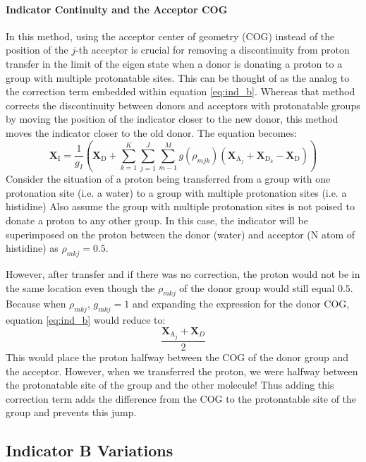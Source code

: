 \documentclass{article}
\newcommand{\mb}[1]{\mathbf{#1}}
\newcommand{\mr}[1]{\mathrm{#1}}
\begin{document}
\paragraph{Indicator Continuity and the Acceptor COG}
In this method, using the acceptor center of geometry (COG) instead of the position of the $j$-th acceptor is crucial for removing a discontinuity from proton transfer in the limit of the eigen state when a donor is donating a proton to a group with multiple protonatable sites.
This can be thought of as the analog to the correction term embedded within equation \ref{eq:ind_b}.
Whereas that method corrects the discontinuity between donors and acceptors with protonatable groups by moving the position of the indicator closer to the new donor, this method moves the indicator closer to the old donor.
The equation becomes:
\begin{equation}\label{eq:ind_b_with_correction}
\mathbf{X}_\mr{I} = \frac{1}{g_I} \left( \mathbf{X}_\mr{D} + \sum^K_{k=1} \sum^J_{j=1}   \sum^M_{m-1} g(\rho_{mjk}) \left(\mathbf{X}_{\mr{A}_j} + \mathbf{X}_{\mr{D}_k} - \mathbf{X}_\mr{D}  \right) \right) 
\end{equation}
Consider the situation of a proton being transferred from a group with one protonation site (i.e. a water) to a group with multiple protonation sites (i.e. a histidine)
Also assume the group with multiple protonation sites is not poised to donate a proton to any other group.
In this case, the indicator will be superimposed on the proton between the donor (water) and acceptor (N atom of histidine) as $\rho_{mkj} = 0.5$.

However, after transfer and if there was no correction, the proton would not be in the same location even though the $\rho_{mkj}$ of the donor group would still equal $0.5$.
Because when $\rho_{mkj}$, $g_{mkj} = 1$ and expanding the expression for the donor COG, equation \ref{eq:ind_b} would reduce to:
\begin{equation}
\frac{\mb{X}_{\mr{A}_j} + \mb{X}_D}{2}
\end{equation}
This would place the proton halfway between the COG of the donor group and the acceptor.
However, when we transferred the proton, we were halfway between the protonatable site of the group and the other molecule!
Thus adding this correction term adds the difference from the COG to the protonatable site of the group and prevents this jump.

\subsection{Indicator B Variations}
\end{document}
